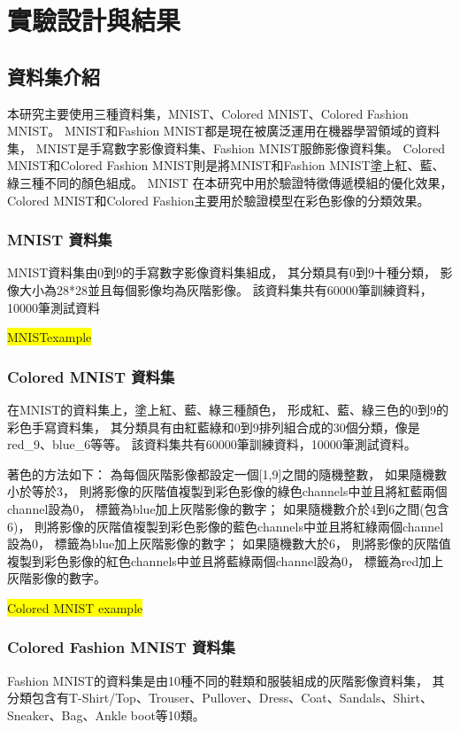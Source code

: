 \documentclass[class=NCU\_thesis, crop=false]{standalone}
\begin{document}
\chapter{實驗設計與結果}
\section{資料集介紹}
本研究主要使用三種資料集，MNIST、Colored MNIST、Colored Fashion MNIST。
MNIST和Fashion MNIST都是現在被廣泛運用在機器學習領域的資料集，
MNIST是手寫數字影像資料集、Fashion MNIST服飾影像資料集。 
Colored MNIST和Colored Fashion MNIST則是將MNIST和Fashion MNIST塗上紅、藍、綠三種不同的顏色組成。
MNIST 在本研究中用於驗證特徵傳遞模組的優化效果，
Colored MNIST和Colored Fashion主要用於驗證模型在彩色影像的分類效果。

    \subsection{MNIST 資料集}
    MNIST資料集由0到9的手寫數字影像資料集組成，
    其分類具有0到9十種分類，
    影像大小為28*28並且每個影像均為灰階影像。
    該資料集共有60000筆訓練資料，10000筆測試資料

    \colorbox {yellow}{MNISTexample}

    \subsection{Colored MNIST 資料集}
    在MNIST的資料集上，塗上紅、藍、綠三種顏色，
    形成紅、藍、綠三色的0到9的彩色手寫資料集，
    其分類具有由紅藍綠和0到9排列組合成的30個分類，像是red\_9、blue\_6等等。
    該資料集共有60000筆訓練資料，10000筆測試資料。

    著色的方法如下：
    為每個灰階影像都設定一個[1,9]之間的隨機整數，
    如果隨機數小於等於3，
    則將影像的灰階值複製到彩色影像的綠色channels中並且將紅藍兩個channel設為0，
    標籤為blue加上灰階影像的數字；
    如果隨機數介於4到6之間(包含6)，
    則將影像的灰階值複製到彩色影像的藍色channels中並且將紅綠兩個channel設為0，
    標籤為blue加上灰階影像的數字；
    如果隨機數大於6，
    則將影像的灰階值複製到彩色影像的紅色channels中並且將藍綠兩個channel設為0，
    標籤為red加上灰階影像的數字。

    \colorbox {yellow}{Colored MNIST example}

    \subsection{Colored Fashion MNIST 資料集}
    Fashion MNIST的資料集是由10種不同的鞋類和服裝組成的灰階影像資料集，
    其分類包含有T-Shirt/Top、Trouser、Pullover、Dress、Coat、Sandals、Shirt、Sneaker、Bag、Ankle boot等10類。
\end{document}
